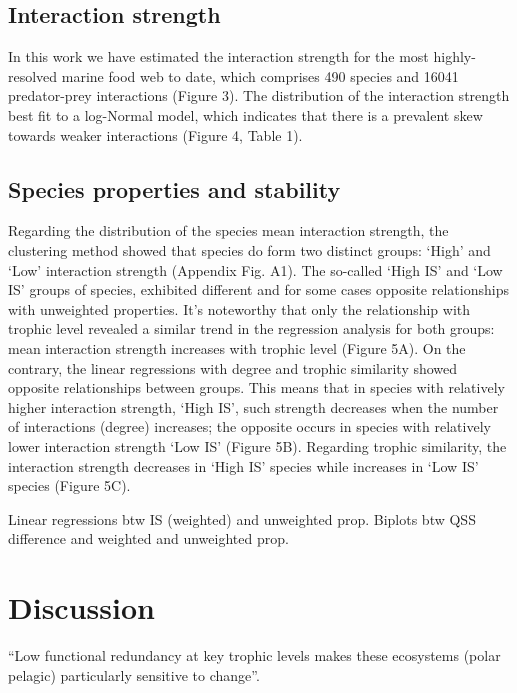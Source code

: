 \documentclass[gc, manuscript]{copernicus}
\begin{document}
\subsection{Interaction strength}

In this work we have estimated the interaction strength for the most
highly-resolved marine food web to date, which comprises 490 species and
16041 predator-prey interactions (Figure 3). The distribution of the
interaction strength best fit to a log-Normal model, which indicates
that there is a prevalent skew towards weaker interactions (Figure 4,
Table 1).

\subsection{Species properties and stability}

Regarding the distribution of the species mean interaction strength, the
clustering method showed that species do form two distinct groups:
`High' and `Low' interaction strength (Appendix Fig. A1). The so-called
`High IS' and `Low IS' groups of species, exhibited different and for
some cases opposite relationships with unweighted properties. It's
noteworthy that only the relationship with trophic level revealed a
similar trend in the regression analysis for both groups: mean
interaction strength increases with trophic level (Figure 5A). On the
contrary, the linear regressions with degree and trophic similarity
showed opposite relationships between groups. This means that in species
with relatively higher interaction strength, `High IS', such strength
decreases when the number of interactions (degree) increases; the
opposite occurs in species with relatively lower interaction strength
`Low IS' (Figure 5B). Regarding trophic similarity, the interaction
strength decreases in `High IS' species while increases in `Low IS'
species (Figure 5C).

Linear regressions btw IS (weighted) and unweighted prop. Biplots btw
QSS difference and weighted and unweighted prop.

\section{Discussion}

``Low functional redundancy at key trophic levels makes these ecosystems
(polar pelagic) particularly sensitive to change''. \citep{Murphy2016}

\clearpage
\conclusions[Conclusions]
\end{document}
